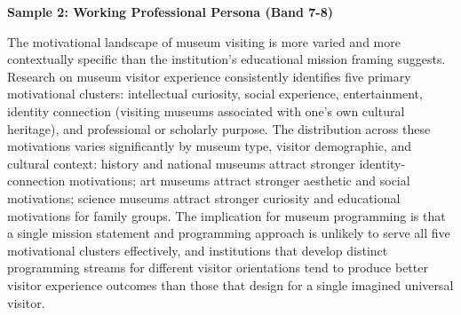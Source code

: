\textbf{Sample 2: Working Professional Persona (Band 7-8)}

The motivational landscape of museum visiting is more varied and more contextually specific than the institution's educational mission framing suggests. Research on museum visitor experience consistently identifies five primary motivational clusters: intellectual curiosity, social experience, entertainment, identity connection (visiting museums associated with one's own cultural heritage), and professional or scholarly purpose. The distribution across these motivations varies significantly by museum type, visitor demographic, and cultural context: history and national museums attract stronger identity-connection motivations; art museums attract stronger aesthetic and social motivations; science museums attract stronger curiosity and educational motivations for family groups. The implication for museum programming is that a single mission statement and programming approach is unlikely to serve all five motivational clusters effectively, and institutions that develop distinct programming streams for different visitor orientations tend to produce better visitor experience outcomes than those that design for a single imagined universal visitor.

\separator


